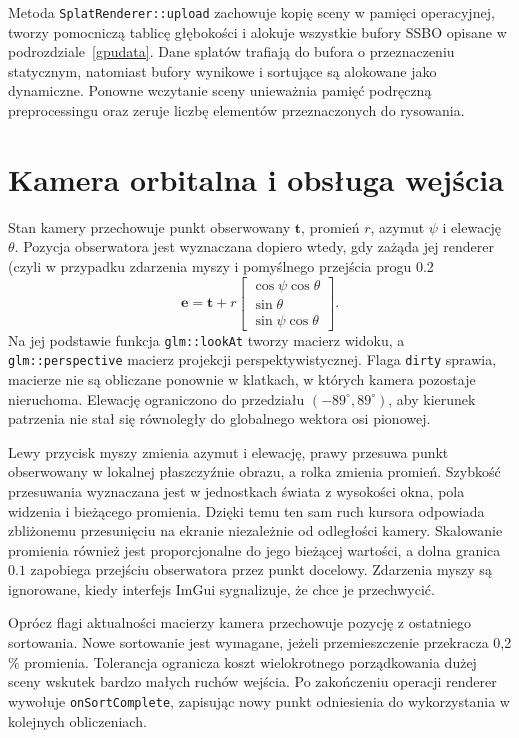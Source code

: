 Metoda \texttt{SplatRenderer::upload} zachowuje kopię sceny w pamięci operacyjnej, tworzy pomocniczą tablicę głębokości i alokuje wszystkie bufory SSBO opisane w podrozdziale~\ref{gpudata}. Dane splatów trafiają do bufora o przeznaczeniu statycznym, natomiast bufory wynikowe i sortujące są alokowane jako dynamiczne. Ponowne wczytanie sceny unieważnia pamięć podręczną preprocessingu oraz zeruje liczbę elementów przeznaczonych do rysowania.
\section{Kamera orbitalna i obsługa wejścia}
\label{sec:impl_kamera}

Stan kamery przechowuje punkt obserwowany $\mathbf{t}$, promień $r$, azymut $\psi$ i elewację $\theta$. Pozycja obserwatora jest wyznaczana dopiero wtedy, gdy zażąda jej renderer (czyli w przypadku zdarzenia myszy i pomyślnego przejścia progu 0.2%
\begin{equation}
  \mathbf{e}=\mathbf{t}+r
  \begin{bmatrix}
    \cos\psi\cos\theta \\
    \sin\theta \\
    \sin\psi\cos\theta
  \end{bmatrix}.
  \label{eq:impl_kamera}
\end{equation}
Na jej podstawie funkcja \texttt{glm::lookAt} tworzy macierz widoku, a \texttt{glm::perspective} macierz projekcji perspektywistycznej. Flaga \texttt{dirty} sprawia, macierze nie są obliczane ponownie w klatkach, w których kamera pozostaje nieruchoma. Elewację ograniczono do przedziału $(-89^\circ,89^\circ)$, aby kierunek patrzenia nie stał się równoległy do globalnego wektora osi pionowej.

Lewy przycisk myszy zmienia azymut i elewację, prawy przesuwa punkt obserwowany w lokalnej płaszczyźnie obrazu, a rolka zmienia promień. Szybkość przesuwania wyznaczana jest w jednostkach świata z wysokości okna, pola widzenia i bieżącego promienia. Dzięki temu ten sam ruch kursora odpowiada zbliżonemu przesunięciu na ekranie niezależnie od odległości kamery. Skalowanie promienia również jest proporcjonalne do jego bieżącej wartości, a dolna granica $0.1$ zapobiega przejściu obserwatora przez punkt docelowy. Zdarzenia myszy są ignorowane, kiedy interfejs ImGui sygnalizuje, że chce je przechwycić.

Oprócz flagi aktualności macierzy kamera przechowuje pozycję z ostatniego sortowania. Nowe sortowanie jest wymagane, jeżeli przemieszczenie przekracza 0,2$\%$ promienia. Tolerancja ogranicza koszt wielokrotnego porządkowania dużej sceny wskutek bardzo małych ruchów wejścia. Po zakończeniu operacji renderer wywołuje \texttt{onSortComplete}, zapisując nowy punkt odniesienia do wykorzystania w kolejnych obliczeniach.

